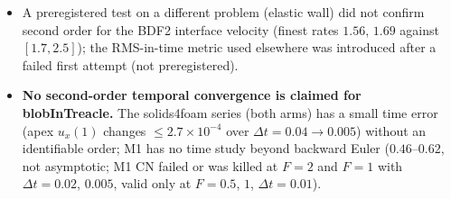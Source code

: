 \documentclass[sn-mathphys,Numbered]{sn-jnl}
\begin{document}
\begin{itemize}
\item A preregistered test on a different problem (elastic wall) did not confirm second order for the BDF2 interface velocity (finest rates $1.56$, $1.69$ against $[1.7,2.5]$); the RMS-in-time metric used elsewhere was introduced after a failed first attempt (not preregistered).
\item \textbf{No second-order temporal convergence is claimed for blobInTreacle.} The solids4foam series (both arms) has a small time error (apex $u_x(1)$ changes $\le2.7\times10^{-4}$ over $\Delta t=0.04\to0.005$) without an identifiable order; M1 has no time study beyond backward Euler ($0.46$--$0.62$, not asymptotic; M1 CN failed or was killed at $F=2$ and $F=1$ with $\Delta t=0.02$, $0.005$, valid only at $F=0.5$, $1$, $\Delta t=0.01$).
\end{itemize}
\end{document}
